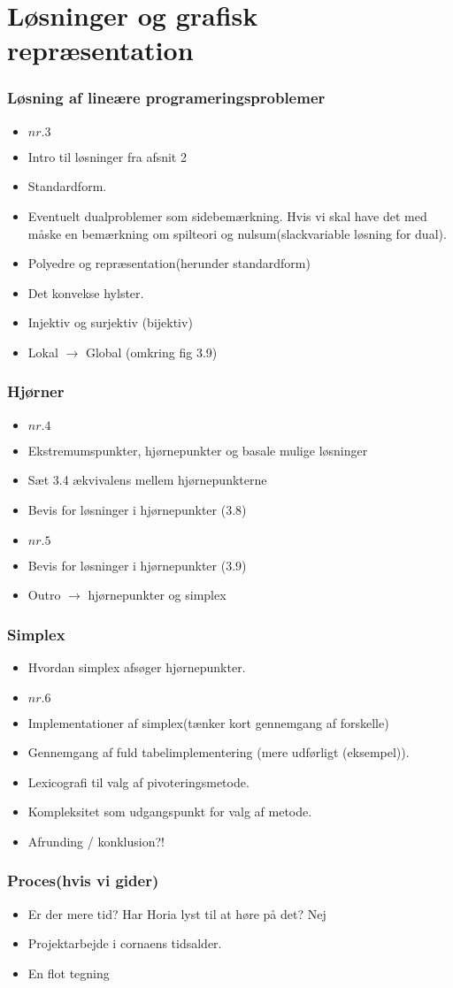 \documentclass{beamer}
\begin{document}
\section{Løsninger og grafisk repræsentation}
%
\begin{frame}
\frametitle{Løsning af lineære programeringsproblemer}
\begin{itemize}
\item \textbf{$nr. 3$}
\item Intro til løsninger fra afsnit 2
\item Standardform.
\item Eventuelt dualproblemer som sidebemærkning. Hvis vi skal have det med måske en bemærkning om spilteori og nulsum(slackvariable løsning for dual).
\item Polyedre og repræsentation(herunder standardform)
\item Det konvekse hylster.
\item Injektiv og surjektiv (bijektiv)
\item Lokal $\rightarrow$ Global (omkring fig 3.9)
\end{itemize}
\end{frame}
%
\begin{frame}
\frametitle{Hjørner}
\begin{itemize}
\item \textbf{$nr. 4$}
\item Ekstremumspunkter, hjørnepunkter og basale mulige løsninger
\item Sæt 3.4 ækvivalens mellem hjørnepunkterne
\item Bevis for løsninger i hjørnepunkter (3.8)
\item \textbf{$nr. 5$}
\item Bevis for løsninger i hjørnepunkter (3.9)
\item Outro $\rightarrow$ hjørnepunkter og simplex
\end{itemize}
\end{frame}
%
\begin{frame}
\frametitle{Simplex}
\begin{itemize}
\item Hvordan simplex afsøger hjørnepunkter.
\item \textbf{$nr. 6$}
\item Implementationer af simplex(tænker kort gennemgang af forskelle)
\item Gennemgang af fuld tabelimplementering (mere udførligt (eksempel)).
\item Lexicografi til valg af pivoteringsmetode.
\item Kompleksitet som udgangspunkt for valg af metode.
\item Afrunding / konklusion?!
\end{itemize}
\end{frame}


\begin{frame}
\frametitle{Proces(hvis vi gider)}
\begin{itemize}
\item Er der mere tid? Har Horia lyst til at høre på det? Nej
\item Projektarbejde i cornaens tidsalder.
\item En flot tegning
\end{itemize}
\end{frame}
\end{document}
